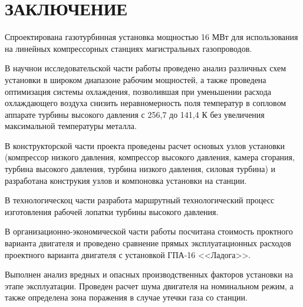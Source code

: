 \section*{ЗАКЛЮЧЕНИЕ}

Спроектирована газотурбинная установка мощностью 16 МВт для использования на линейных
компрессорных станциях магистральных газопроводов.

В научнои исследовательской части работы проведено анализ различных схем установки в широком
диапазоне рабочим мощностей, а также проведена оптимизация системы охлаждения, позволившая при уменьшении
расхода охлаждающего воздуха снизить неравномерность поля температур в сопловом аппарате
турбины высокого давления с 256,7 до 141,4 К без увеличения максимальной температуры металла.

В конструкторской части проекта проведены расчет основых узлов установки (компрессор низкого давления, компрессор высокого давления,
камера сгорания, турбина высокого давления, турбина низкого давления, силовая турбина) и разработана
конструкия узлов и компоновка установки на станции.

В технологическоц части разработа маршрутный технологический процесс изготовления рабочей лопатки турбины высокого давления.

В организационно-экономической части работы посчитана стоимость проктного варианта двигателя и проведено сравнение прямых
эксплуатационных расходов проектного варианта двигателя с установкой ГПА-16 <<Ладога>>.

Выполнен анализ вредных и опасных производственных факторов установки на этапе эксплуатации. Проведен расчет шума двигателя на
номинальном режим, а также определена зона поражения в случае утечки газа со станции.
